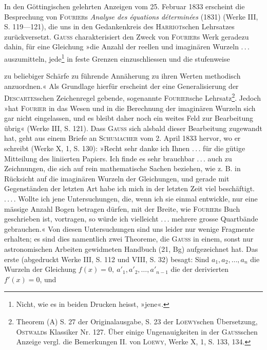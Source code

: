 In den Göttingischen gelehrten Anzeigen vom 25. Februar 1833 erscheint
die Besprechung von \textsc{Fourier}s \textit{Analyse des équations déterminées} (1831) (Werke
III, S. 119—121), die uns in den Gedankenkreis des \textsc{Harriot}schen Lehrsatzes
zurückversetzt. \textsc{Gauss} charakterisiert den Zweck von \textsc{Fourier}s Werk geradezu
dahin, für eine Gleichung »die Anzahl der reellen und imaginären Wurzeln
\mbox{.\,.\,.} auszumitteln, jede\footnote{Nicht, wie es in beiden Drucken heisst, »jene«.} in feste Grenzen einzuschliessen und die stufenweise
\par\clearpage{}
\noindent zu beliebiger Schärfe zu führende Annäherung zu ihren Werten methodisch
anzuordnen.« Als Grundlage hierfür erscheint der eine Generalisierung der
\textsc{Descartes}schen Zeichenregel gebende, sogenannte \textsc{Fourier}sche Lehrsatz\footnote{Theorem (A) S. 27 der Originalausgabe, S. 23 der \textsc{Loewy}schen Übersetzung, \textsc{Ostwald}s Klassiker Nr. 127. Über einige Ungenauigkeiten in der \textsc{Gauss}schen Anzeige vergl. die Bemerkungen II. von \textsc{Loewy}, Werke X, 1, S. 133, 134.}.
Jedoch »hat \textsc{Fourier} in das Wesen und in die Berechnung der imaginären
Wurzeln sich gar nicht eingelassen, und es bleibt daher noch ein weites Feld
zur Bearbeitung übrig« (Werke III, S. 121). Dass \textsc{Gauss} sich alsbald dieser
Bearbeitung zugewandt hat, geht aus einem Briefe an \textsc{Schumacher} vom
2. April 1833 hervor, wo er schreibt (Werke X, 1, S. 130): »Recht sehr danke
ich Ihnen \mbox{.\,.\,.} für die gütige Mitteilung des liniierten Papiers. Ich finde es
sehr brauchbar \mbox{.\,.\,.} auch zu Zeichnungen, die sich auf rein mathematische
Sachen beziehen, wie z. B. in Rücksicht auf die imaginären Wurzeln der
Gleichungen, und gerade mit Gegenständen der letzten Art habe ich mich in
der letzten Zeit viel beschäftigt. \mbox{.\,.\,.\,.} Wollte ich jene Untersuchungen, die,
wenn ich sie einmal entwickle, nur eine mässige Anzahl Bogen betragen
dürfen, mit der Breite, wie \textsc{Fourier}s Buch geschrieben ist, vortragen, so würde
ich vielleicht \mbox{.\,.\,.} mehrere grosse Quartbände gebrauchen.« Von diesen Untersuchungen
sind uns leider nur wenige Fragmente erhalten; es sind dies namentlich
zwei Theoreme, die \textsc{Gauss} in einem, sonst nur astronomischen Arbeiten
gewidmeten Handbuch (21, Bg) aufgezeichnet hat. Das erste (abgedruckt
Werke III, S. 112 und VIII, S. 32) besagt: Sind \(a_1,a_2,\ldots,a_n\) die Wurzeln
der Gleichung \(f(x)=0,\ a'_1,a'_2,\ldots,a'_{n-1}\) die der derivierten \(f'(x)=0\), und
